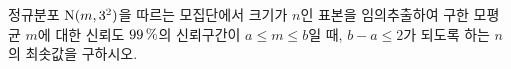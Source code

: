 정규분포 $\mathrm{N}(m{,}\mkern3mu\mathopen{}3^2)$을 따르는 모집단에서 크기가 $n$인 표본을 임의추출하여 구한 모평균 $m$에 대한 신뢰도 $99\mkern3mu \%$의 신뢰구간이 $a\le m\le b$일 때, $b-a\le 2$가 되도록 하는 $n$의 최솟값을 구하시오. 
